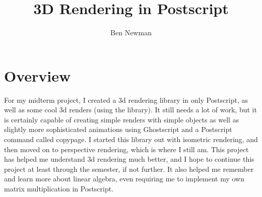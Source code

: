 \documentclass[12pt]{article}
\title{3D Rendering in Postscript}
\author{Ben Newman}
\begin{document}
	\maketitle
	\newpage
	\section{Overview}
	For my midterm project, I created a 3d rendering library in only Postscript, as well as some cool 3d renders (using the library). It still needs a lot of work, but it is certainly capable of creating simple renders with simple objects as well as slightly more sophisticated animations using Ghostscript and a Postscript command called copypage. I started this library out with isometric rendering, and then moved on to perspective rendering, which is where I still am. This project has helped me understand 3d rendering much better, and I hope to continue this project at least through the semester, if not further. It also helped me remember and learn more about linear algebra, even requiring me to implement my own matrix multiplication in Postscript.
\end{document}
